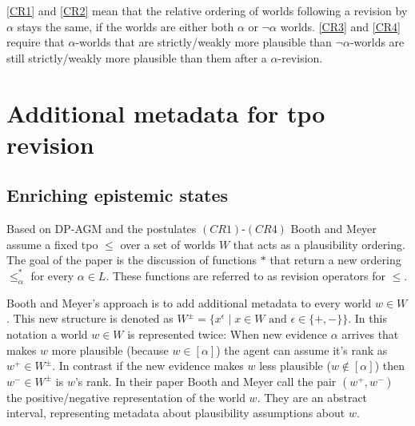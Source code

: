 \documentclass[english, 12pt]{scrartcl}
\theoremstyle{definition}
\theoremstyle{definition}
\theoremstyle{definition}
\begin{document}
\ref{CR1} and \ref{CR2} mean that the relative ordering of worlds following a revision by $\alpha$ stays the same, if the worlds are either both $\alpha$ or $\neg\alpha$ worlds. \ref{CR3} and \ref{CR4} require that $\alpha$-worlds that are strictly/weakly more plausible than $\neg\alpha$-worlds are still strictly/weakly more plausible than them after a $\alpha$-revision.


\section{Additional metadata for tpo revision}
\subsection{Enriching epistemic states}
Based on DP-AGM and the postulates $(CR1)$-$(CR4)$ Booth and Meyer assume a fixed tpo $\leq$ over a set of worlds $W$ that acts as a plausibility ordering. The goal of the paper is the discussion of functions $\ast$ that return a new ordering $\leq_{\alpha}^{\ast}$ for every $\alpha \in L$. These functions are referred to as revision operators for $\leq$.

Booth and Meyer's \cite{Booth2011} approach is to add additional metadata to every world $w \in W$. This new structure is denoted as $W^{\pm} = \{x^{\epsilon} \mid x \in W \textrm{ and } \epsilon \in \{+, -\}\}$. In this notation a world $w \in W$ is represented twice: When new evidence $\alpha$ arrives that makes $w$ more plausible (because $w \in [\alpha]$) the agent can assume it's rank as $w^{+} \in W^{\pm}$. In contrast if the new evidence makes $w$ less plausible ($w \notin [\alpha]$) then $w^{-} \in W^{\pm}$ is $w$'s rank. In their paper Booth and Meyer call the pair $(w^{+}, w^{-})$ the positive/negative representation of the world $w$. They are an abstract interval, representing metadata about plausibility assumptions about $w$.
\end{document}
